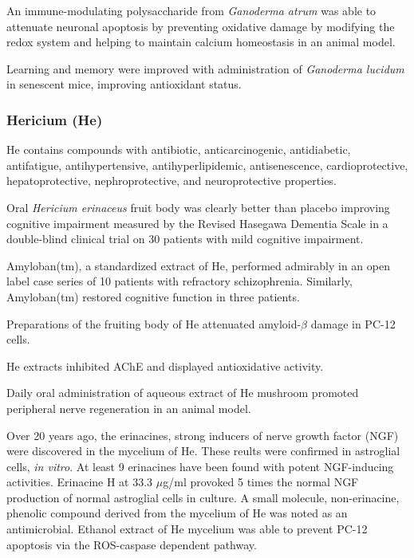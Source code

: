 An immune-modulating polysaccharide from \textit{Ganoderma atrum}
was able to attenuate neuronal apoptosis
by preventing oxidative damage by modifying the
redox system and helping to maintain calcium homeostasis
in an animal model.
\cite{li2011ganoderma}

Learning and memory were improved with
administration of \textit{Ganoderma lucidum}
in senescent mice,
improving antioxidant status.
\cite{wang2004effects}


\subsubsection{Hericium (He)}

He contains compounds with
antibiotic, anticarcinogenic, antidiabetic, antifatigue,
antihypertensive, antihyperlipidemic, antisenescence,
cardioprotective, hepatoprotective, nephroprotective,
and neuroprotective properties.
\cite{friedman2015chemistry}

Oral \textit{Hericium erinaceus} fruit body
was clearly better than placebo
improving cognitive impairment
measured by the Revised Hasegawa Dementia Scale
in a double-blind clinical trial on 30 patients
with mild cognitive impairment.
\cite{mori2009improving}

Amyloban(tm), a standardized extract of He,
performed admirably in an open label case series
of 10 patients with refractory schizophrenia.
\cite{inanaga2014improvement}
Similarly, Amyloban(tm) restored cognitive function
in three patients.
\cite{inanaga2015treatment}

Preparations of the fruiting body of He
attenuated amyloid-$\beta$ damage in PC-12 cells.
\cite{liu2015systemic}


He extracts inhibited AChE and displayed antioxidative activity.
\cite{jung2007ache}



Daily oral administration of
aqueous extract of He mushroom
promoted peripheral nerve regeneration
in an animal model.
\cite{wong2011peripheral,
wong2014hericium}


Over 20 years ago, the erinacines,
strong inducers of nerve growth factor (NGF) were discovered
in the mycelium of He.
\cite{kawagishi1994erinacines}
These reults were confirmed in astroglial cells, \textit{in vitro}.
\cite{
kawagishi1996erinacines,
kawagishi1996erinacine}
At least 9 erinacines have been found with potent NGF-inducing
activities. Erinacine H at 33.3 $\mu$g/ml provoked 5 times
the normal NGF production of normal astroglial cells in culture.
\cite{
lee2000two,
kawagishi2006erinacines}
A small molecule, non-erinacine, phenolic compound derived from
the mycelium of He was noted as an antimicrobial.
\cite{okamoto1993antimicrobial}
Ethanol extract of He mycelium was able to
prevent PC-12 apoptosis via the ROS-caspase dependent pathway.
\cite{chang2016improvement}

